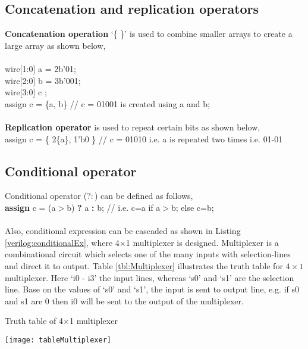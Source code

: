 \subsection{Concatenation and replication operators}

\textbf{Concatenation operation} `\{ \}' is used to combine smaller arrays to create a large array as shown below, \\ \\
wire[1:0] a = 2b'01;\\
wire[2:0] b = 3b'001;\\
wire[3:0] c ;\\
assign c = \{a, b\} // c = 01001 is created using a and b; \\
\\
\textbf{Replication operator} is used to repeat certain bits as shown below,\\
assign c = \{ 2\{a\}, 1'b0 \} // c = 01010 i.e. a is repeated two times i.e. 01-01

\subsection{Conditional operator}
Conditional operator ($?:$) can be defined as follows, 
\\
\textbf{assign} c = (a$>$b) \textbf{?} a \textbf{:} b; // i.e. c=a if a$>$b; else c=b;
\\ \\
Also, conditional expression can be cascaded as shown in Listing \ref{verilog:conditionalEx}, where 4$\times$1 multiplexer is designed. Multiplexer is a combinational circuit which selects one of the many inputs with selection-lines and direct it to output. Table \ref{tbl:Multiplexer} illustrates the truth table for $4\times 1$ multiplexer. Here `i0 - i3' the input lines, whereas `s0' and `s1' are the selection line. Base on the values of `s0' and `s1', the input is sent to output line, e.g. if s0 and s1 are 0 then i0 will be sent to the output of the multiplexer.  

\begin{table}[!h]
	\centering
	\caption{Truth table of 4$\times$1 multiplexer}
	\texttt{[image: tableMultiplexer]}
	\label{tbl:Multiplexer}
\end{table}



